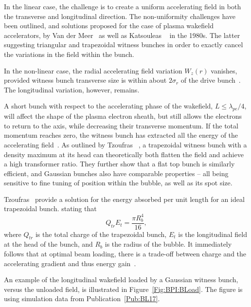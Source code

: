 In the linear case, the challenge is to create a uniform accelerating field in both the transverse and longitudinal direction.
The non-uniformity challenges have been outlined, and solutions proposed for the case of plasma wakefield accelerators, by Van der Meer~\cite{van_der_meer:1985} as well as Katsouleas \etal~\cite{katsouleas:1987} in the 1980s.
The latter suggesting triangular and trapezoidal witness bunches in order to exactly cancel the variations in the field within the bunch.

In the non-linear case, the radial accelerating field variation $W_{z}(r)$ vanishes, provided witness bunch transverse size is within about $2\sigma_{r}$ of the drive bunch~\cite{rosenzweig:1991}.
The longitudinal variation, however, remains.

A short bunch with respect to the accelerating phase of the wakefield, $L \leq \lambda_{pe}/4$, will affect the shape of the plasma electron sheath, but still allows the electrons to return to the axis, while decreasing their transverse momentum.
If the total momentum reaches zero, the witness bunch has extracted all the energy of the accelerating field~\cite{lu:2006a,lu:2006}.
As outlined by Tzoufras \etal~\cite{tzoufras:2009}, a trapezoidal witness bunch with a density maximum at its head can theoretically both flatten the field and achieve a high transformer ratio.
They further show that a flat top bunch is similarly efficient, and Gaussian bunches also have comparable properties -- all being sensitive to fine tuning of position within the bubble, as well as its spot size.

Tzoufras \etal ~provide a solution for the energy absorbed per unit length for an ideal trapezoidal bunch. stating that
\begin{equation}
    Q_{tr}E_{t} = \frac{\pi R_{b}^{4}}{16}, \label{EQ:Trapez}
\end{equation}
where $Q_{tr}$ is the total charge of the trapezoidal bunch, $E_{t}$ is the longitudinal field at the head of the bunch, and $R_{b}$ is the radius of the bubble.
It immediately follows that at optimal beam loading, there is a trade-off between charge and the accelerating gradient and thus energy gain~\cite{tzoufras:2009}.

An example of the longitudinal wakefield loaded by a Gaussian witness bunch, versus the unloaded field, is illustrated in Figure~\ref{Fig:BPI:BLoad}.
The figure is using simulation data from Publication~\ref{Pub:BL17}.

